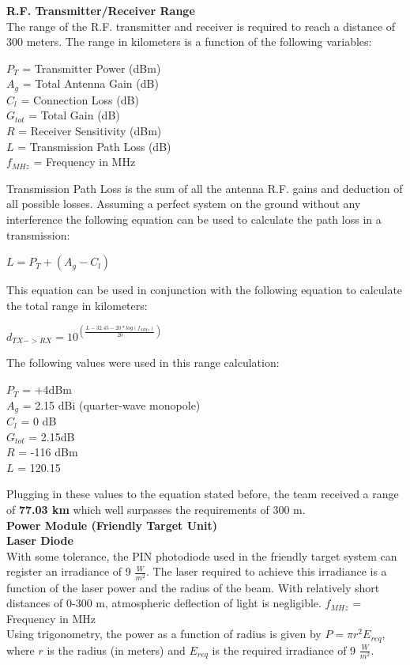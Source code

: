 \documentclass[letterpaper,10pt]{article}
\begin{document}
\begin{spacing}{1.15}
\normalsize\textbf{R.F. Transmitter/Receiver Range} \\
The range of the R.F. transmitter and receiver is required to reach a distance of 300 meters. The range in kilometers is a function of the following variables:
\begin{center}
$P_T$ = Transmitter Power (dBm) \\
$A_g$ = Total Antenna Gain (dB) \\
$C_l$ = Connection Loss (dB) \\ 
$G_{tot}$ = Total Gain (dB) \\
$R$ = Receiver Sensitivity (dBm) \\
$L$ = Transmission Path Loss (dB) \\
$f_{MHz}$ = Frequency in MHz \\
\end{center}

Transmission Path Loss is the sum of all the antenna R.F. gains and deduction of all possible losses. Assuming a perfect system on the ground without any interference the following equation can be used to calculate the path loss in a transmission:
\begin{center}
	$L = P_T + (A_g - C_l)$
\end{center}
This equation can be used in conjunction with the following equation to calculate the total range in kilometers:
\begin{center}
	\large
	$d_{TX->RX} = 10^{\left( \frac{L - 32.45 -20*log(f_{MHz})}{20}\right)}$
\end{center}
The following values were used in this range calculation:
\begin{center}
$P_T$ = +4dBm \\
$A_g$ = 2.15 dBi (quarter-wave monopole) \\
$C_l$ = 0 dB \\ 
$G_{tot}$ =  2.15dB\\
$R$ = -116 dBm \\
$L$ =  120.15\\
\end{center}
Plugging in these values to the equation stated before, the team received a range of \textbf{77.03 km} which well surpasses the requirements of 300 m. \\

\normalsize\textbf{Power Module (Friendly Target Unit)} \\

\normalsize\textbf{Laser Diode} \\
With some tolerance, the PIN photodiode used in the friendly target system can register an irradiance of 9 $\frac{W}{m^2}$. The laser required to achieve this irradiance is a function of the laser power and the radius of the beam. With relatively short distances of 0-300 m, atmospheric deflection of light is negligible. 
$f_{MHz}$ = Frequency in MHz \\
Using trigonometry, the power as a function of radius is given by $P = \pi r^2  E_{req} $, where $r$ is the radius (in meters) and $E_{req}$ is the required irradiance of 9 $\frac{W}{m^2}$. 


\end{spacing}
\end{document}
